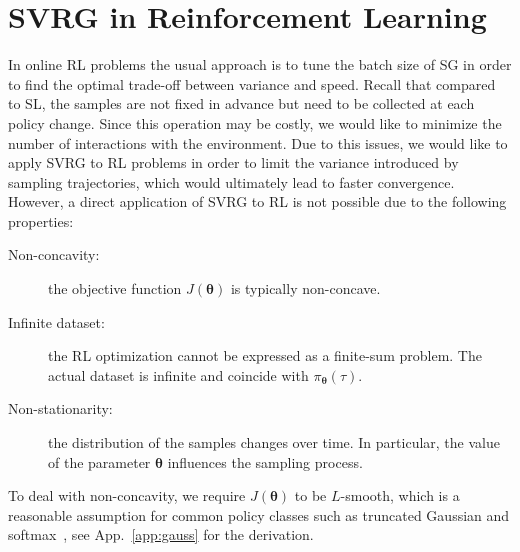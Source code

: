\documentclass{article}
\makeatletter
\theoremstyle{remark}
\theoremstyle{definition}
\DeclareRobustCommand{\eg}{e.g.,\@\xspace}
\newcommand{\todopir}[1]{\todo[color=blued, inline]{\small #1}}
\newcommand{\vtheta}{\boldsymbol{\theta}}
\makeatother
\begin{document}
\section{SVRG in Reinforcement Learning}\label{sec:alg}
In online RL problems the usual approach is to tune the batch size of SG in order to find the optimal trade-off between variance and speed.
Recall that compared to SL, the samples are not fixed in advance but need to be collected at each policy change.
Since this operation may be costly, we would like to minimize the number of interactions with the environment.
Due to this issues, we would like to apply SVRG to RL problems in order to limit the variance introduced by sampling trajectories, which would ultimately lead to faster convergence.
However, a direct application of SVRG to RL is not possible due to the following properties:
\begin{description}
        \item[Non-concavity:] the objective function $J(\vtheta)$ is typically non-concave.
        \item[Infinite dataset:] the RL optimization cannot be expressed as a finite-sum problem. The actual dataset is infinite and coincide with $\pi_{\vtheta}(\tau)$.
        \item[Non-stationarity:] the distribution of the samples changes over time. In particular, the value of the parameter $\vtheta$ influences the sampling process.
\end{description}
To deal with non-concavity, we require $J(\vtheta)$ to be $L$-smooth, which is a reasonable assumption for common policy classes such as truncated Gaussian and softmax~\citep[\eg][]{Furmston2012unifying,pirotta2015lipschitz}, see App.~\ref{app:gauss} for the derivation.
\end{document}
